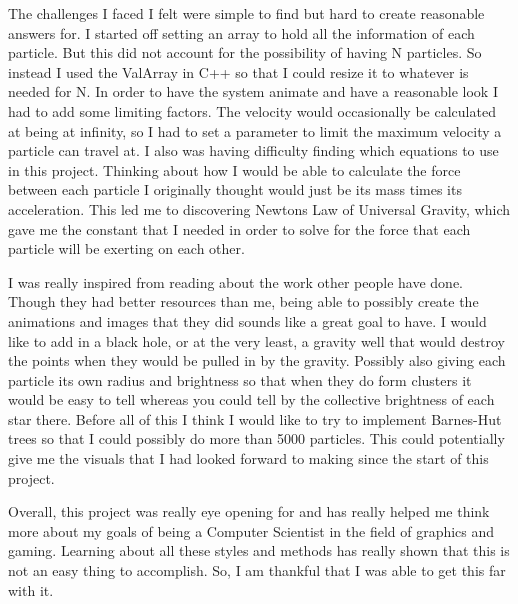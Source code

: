 \documentclass{egpubl}
\begin{document}
The challenges I faced I felt were simple to find but hard to create reasonable answers for. I started off setting an array to hold all the information of each particle. But this did not account for the possibility of having N particles. So instead I used the ValArray in C++ so that I could resize it to whatever is needed for N. In order to have the system animate and have a reasonable look I had to add some limiting factors. The velocity would occasionally be calculated at being at infinity, so I had to set a parameter to limit the maximum velocity a particle can travel at. I also was having difficulty finding which equations to use in this project. Thinking about how I would be able to calculate the force between each particle I originally thought would just be its mass times its acceleration. This led me to discovering Newtons Law of Universal Gravity, which gave me the constant that I needed in order to solve for the force that each particle will be exerting on each other.

I was really inspired from reading about the work other people have done. Though they had better resources than me, being able to possibly create the animations and images that they did sounds like a great goal to have. I would like to add in a black hole, or at the very least, a gravity well that would destroy the points when they would be pulled in by the gravity. Possibly also giving each particle its own radius and brightness so that when they do form clusters it would be easy to tell whereas you could tell by the collective brightness of each star there. Before all of this I think I would like to try to implement Barnes-Hut trees so that I could possibly do more than 5000 particles. This could potentially give me the visuals that I had looked forward to making since the start of this project. 

Overall, this project was really eye opening for and has really helped me think more about my goals of being a Computer Scientist in the field of graphics and gaming. Learning about all these styles and methods has really shown that this is not an easy thing to accomplish. So, I am thankful that I was able to get this far with it.


\printbibliography[heading=bibnumbered]
\end{document}
